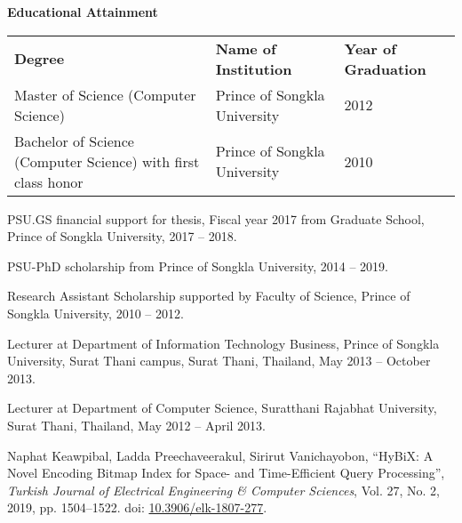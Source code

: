 \documentclass[../main/thesis.tex]{subfiles}
\begin{document}
\begin{vitae}
	\setlength\parindent{0cm}	\textbf{Educational Attainment}	
	\vspace{.6em} \newline
	\begin{tabular*}{\textwidth}{@{}E{.32\textwidth} E{.3\textwidth}@{} E{.3\textwidth}@{}}
	
		\textbf{Degree}	& \textbf{Name of Institution} & \textbf{Year of Graduation} \\
		
		Master of Science (Computer Science) & Prince of Songkla University & 2012 \\[1.1cm]
		Bachelor of Science (Computer Science) with first class honor & Prince of Songkla University & 2010 \\
	\end{tabular*}\vspace{.7cm}

	{
		\begin{vitaeItem}
			\item PSU.GS financial support for thesis, Fiscal year 2017 from Graduate School, Prince of Songkla University, 2017 -- 2018.
			\item PSU-PhD scholarship from Prince of Songkla University, 2014 -- 2019.
			\item Research Assistant Scholarship supported by Faculty of Science, Prince of Songkla University, 2010 -- 2012.
		\end{vitaeItem}
	}

	{
		\begin{vitaeItem}
			\item Lecturer at Department of Information Technology Business, Prince of Songkla University, Surat Thani campus, Surat Thani, Thailand, May 2013 -- October 2013.
			\item Lecturer at Department of Computer Science, Suratthani Rajabhat University, Surat Thani, Thailand, May 2012 -- April 2013.
		\end{vitaeItem}
	}

	{
		\begin{pubItem}
			\item Naphat Keawpibal, Ladda Preechaveerakul, Sirirut Vanichayobon, ``HyBiX: A Novel Encoding Bitmap Index for Space- and Time-Efficient Query Processing'', \textit{Turkish Journal of Electrical Engineering \& Computer Sciences}, Vol. 27, No. 2, 2019, pp. 1504--1522. doi: \href{https://doi.org/10.3906/elk-1807-277}{10.3906/elk-1807-277}.
			

\end{pubItem}}
\end{vitae}
\end{document}
